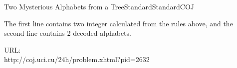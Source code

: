 \begin{problema}{Two Mysterious Alphabets from a Tree}{Standard}{Standard}{COJ}
\OutputFile

The first line contains two integer calculated from the rules above, and the second line contains 2 decoded alphabets.  \\


\Example




URL:\\ 
http://coj.uci.cu/24h/problem.xhtml?pid=2632

\end{problema}
